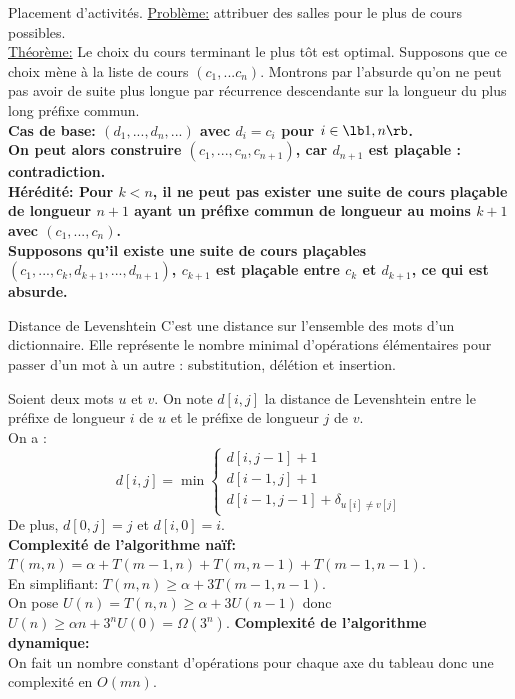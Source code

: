 \documentclass[french, 11pt]{article}
\begin{document}
\begin{ex}{Placement d'activités.}{}
    \underline{Problème:} attribuer des salles pour le plus de cours possibles.\\
    \underline{Théorème:} Le choix du cours terminant le plus tôt est optimal.
    \tcblower
    Supposons que ce choix mène à la liste de cours $(c_1,...c_n)$. Montrons par l'absurde qu'on ne peut pas avoir de suite plus longue par récurrence descendante sur la longueur du plus long préfixe commun.\\
    \bf{Cas de base:} $(d_1,...,d_n,...)$ avec $d_i=c_i$ pour $i\in\lb1,n\rb$.\\
    On peut alors construire $(c_1,...,c_n,c_{n+1})$, car $d_{n+1}$ est plaçable : contradiction.\\
    \bf{Hérédité:} Pour $k<n$, il ne peut pas exister une suite de cours plaçable de longueur $n+1$ ayant un préfixe commun de longueur au moins $k+1$ avec $(c_1,...,c_n)$.\\
    Supposons qu'il existe une suite de cours plaçables $(c_1,...,c_k,d_{k+1},...,d_{n+1})$, $c_{k+1}$ est plaçable entre $c_k$ et $d_{k+1}$, ce qui est absurde.
\end{ex}

\pagebreak

\begin{ex}{Distance de Levenshtein}{}
    C'est une distance sur l'ensemble des mots d'un dictionnaire. Elle représente le nombre minimal d'opérations élémentaires pour passer d'un mot à un autre : substitution, délétion et insertion.
    \par Soient deux mots $u$ et $v$. On note $d[i,j]$ la distance de Levenshtein entre le préfixe de longueur $i$ de $u$ et le préfixe de longueur $j$ de $v$.\\
    On a :
    \begin{equation*}
        d[i,j] = \min\begin{cases}
            d[i,j-1] + 1\\
            d[i-1,j] + 1\\
            d[i-1,j-1] + \delta_{u[i] \neq v[j]}
        \end{cases}
    \end{equation*}
    De plus, $d[0,j]=j$ et $d[i,0]=i$.\\
    \textbf{Complexité de l'algorithme naïf:}\\
    $T(m,n)=\alpha + T(m-1,n) + T(m,n-1) + T(m-1,n-1)$.\\
    En simplifiant: $T(m,n) \geq \alpha + 3T(m-1, n-1)$.\\
    On pose $U(n)=T(n,n)\geq\alpha+3U(n-1)$ donc $U(n)\geq\alpha n + 3^nU(0)=\Omega(3^n)$.\n
    \textbf{Complexité de l'algorithme dynamique:}\\
    On fait un nombre constant d'opérations pour chaque axe du tableau donc une complexité en $O(mn)$.
\end{ex}
\end{document}
